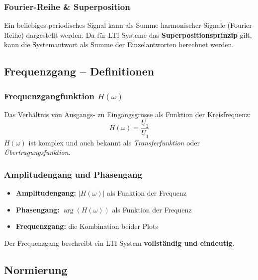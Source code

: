 \documentclass[a4paper,12pt]{article}
\begin{document}
	\subsubsection*{Fourier-Reihe \& Superposition}
	Ein beliebiges periodisches Signal kann als Summe harmonischer Signale
	(Fourier-Reihe) dargestellt werden. Da für LTI-Systeme das
	\textbf{Superpositionsprinzip} gilt, kann die Systemantwort als Summe der
	Einzelantworten berechnet werden.
	
	\subsection{Frequenzgang -- Definitionen}
	
	\subsubsection*{Frequenzgangfunktion $H(\omega)$}
	Das Verhältnis von Ausgangs- zu Eingangsgrösse als Funktion der Kreisfrequenz:
	\begin{equation}
		H(\omega) = \frac{\underline{U}_2}{\underline{U}_1}
	\end{equation}
	$H(\omega)$ ist komplex und auch bekannt als \textit{Transferfunktion} oder
	\textit{Übertragungsfunktion}.
	
	\subsubsection*{Amplitudengang und Phasengang}
	\begin{itemize}
		\item \textbf{Amplitudengang:} $|H(\omega)|$ als Funktion der Frequenz
		\item \textbf{Phasengang:} $\arg(H(\omega))$ als Funktion der Frequenz
		\item \textbf{Frequenzgang:} die Kombination beider Plots
	\end{itemize}
	Der Frequenzgang beschreibt ein LTI-System \textbf{vollständig und eindeutig}.
	
	
	\subsection{Normierung}
	
\end{document}
